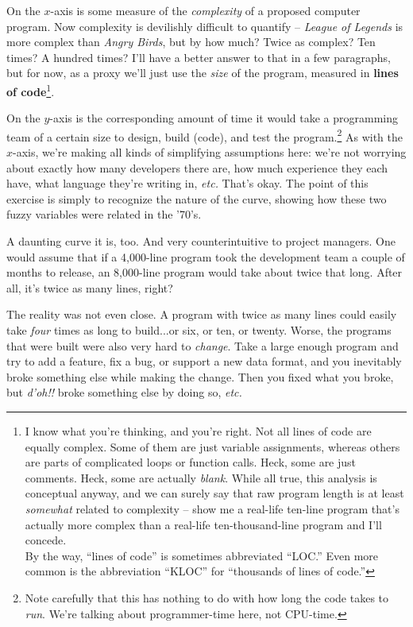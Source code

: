 On the $x$-axis is some measure of the \textit{complexity} of a proposed
computer program. Now complexity is devilishly difficult to quantify --
\textit{League of Legends} is more complex than \textit{Angry Birds}, but by
how much? Twice as complex? Ten times? A hundred times? I'll have a better
answer to that in a few paragraphs, but for now, as a proxy we'll just use the
\textit{size} of the program, measured in \textbf{lines of code}\footnote{I
know what you're thinking, and you're right. Not all lines of code are equally
complex. Some of them are just variable assignments, whereas others are parts
of complicated loops or function calls. Heck, some are just comments. Heck,
some are actually \textit{blank}. While all true, this analysis is conceptual
anyway, and we can surely say that raw program length is at least
\textit{somewhat} related to complexity -- show me a real-life ten-line
program that's actually more complex than a real-life ten-thousand-line
program and I'll concede.\\By the way, ``lines of code'' is sometimes
abbreviated ``LOC.'' Even more common is the abbreviation ``KLOC'' for
``thousands of lines of code.''}.

On the $y$-axis is the corresponding amount of time it would take a
programming team of a certain size to design, build (code), and test the
program.\footnote{Note carefully that this has nothing to do with how long the
code takes to \textit{run}. We're talking about programmer-time here, not
CPU-time.} As with the $x$-axis, we're making all kinds of simplifying
assumptions here: we're not worrying about exactly how many developers
there are, how much experience they each have, what language they're writing
in, \textit{etc.} That's okay. The point of this exercise is simply to
recognize the nature of the curve, showing how these two fuzzy variables were
related in the '70's.

A daunting curve it is, too. And very counterintuitive to project managers.
One would assume that if a 4,000-line program took the development team a
couple of months to release, an 8,000-line program would take about twice that
long. After all, it's twice as many lines, right?

The reality was not even close. A program with twice as many lines could
easily take \textit{four} times as long to build...or six, or ten, or twenty.
Worse, the programs that were built were also very hard to \textit{change}.
Take a large enough program and try to add a feature, fix a bug, or support a
new data format, and you inevitably broke something else while making the
change. Then you fixed what you broke, but \textit{d'oh!!} broke something
else by doing so, \textit{etc.}

